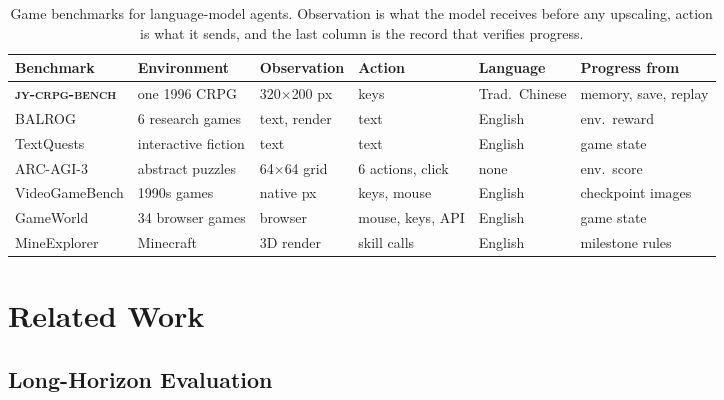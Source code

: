 \documentclass{article} %
\newcommand{\bench}{\textsc{jy-crpg-bench}}
\begin{document}
\begin{table}[!htb]
\centering
\caption{Game benchmarks for language-model agents. Observation is what the model receives before any upscaling, action is what it sends, and the last column is the record that verifies progress.}
\label{tab:related}
\footnotesize
\setlength{\tabcolsep}{2pt}
\begin{tabular}{@{}llllll@{}}
\toprule
Benchmark & Environment & Observation & Action & Language & Progress from \\
\midrule
\textbf{\bench{}} & one 1996 CRPG & 320$\times$200 px & keys & Trad.\ Chinese & memory, save, replay \\
\midrule
BALROG & 6 research games & text, render & text & English & env.\ reward \\
TextQuests & interactive fiction & text & text & English & game state \\
ARC-AGI-3 & abstract puzzles & 64$\times$64 grid & 6 actions, click & none & env.\ score \\
VideoGameBench & 1990s games & native px & keys, mouse & English & checkpoint images \\
GameWorld & 34 browser games & browser & mouse, keys, API & English & game state \\
MineExplorer & Minecraft & 3D render & skill calls & English & milestone rules \\
\bottomrule
\end{tabular}
\end{table}

\section{Related Work}
\label{sec:related}

\subsection{Long-Horizon Evaluation}
\end{document}
